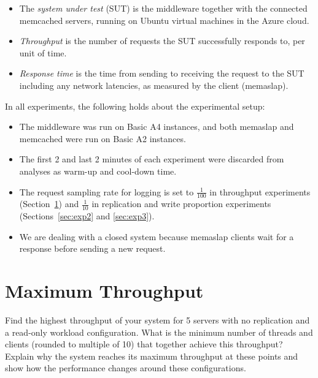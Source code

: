 \documentclass[11pt]{article}
\begin{document}
\begin{itemize}
\item The \emph{system under test} (SUT) is the middleware together with the connected memcached servers, running on Ubuntu virtual machines in the Azure cloud.
\item \emph{Throughput} is the number of requests the SUT successfully responds to, per unit of time.
\item \emph{Response time} is the time from sending to receiving the request to the SUT including any network latencies, as measured by the client (memaslap).
\end{itemize}

In all experiments, the following holds about the experimental setup:
\begin{itemize}
\item The middleware was run on Basic A4 instances, and both memaslap and memcached were run on Basic A2 instances.
\item The first 2 and last 2 minutes of each experiment were discarded from analyses as warm-up and cool-down time.
\item The request sampling rate for logging is set to $\frac{1}{100}$ in throughput experiments (Section~\ref{sec:exp1}) and $\frac{1}{10}$ in replication and write proportion experiments (Sections~\ref{sec:exp2} and \ref{sec:exp3}).
\item We are dealing with a closed system because memaslap clients wait for a response before sending a new request.
\end{itemize}


\clearpage
\section{Maximum Throughput}
\label{sec:exp1}

Find the highest throughput of your system for 5 servers with no replication and a read-only workload configuration. What is the minimum number of threads and clients (rounded to multiple of 10) that together achieve this throughput? Explain why the system reaches its maximum throughput at these points and show how the performance changes around these configurations.
\end{document}
